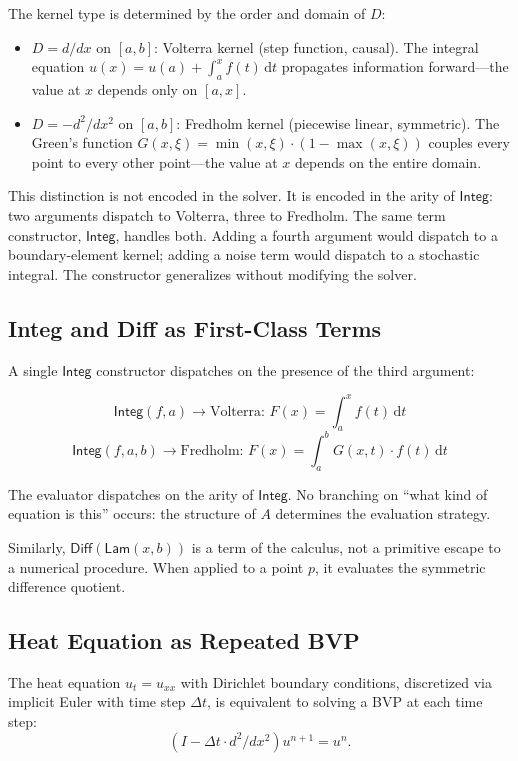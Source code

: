 \documentclass{lmcs}
\theoremstyle{plain}
\theoremstyle{definition}
\begin{document}
The kernel type is determined by the order and domain of $D$:
\begin{itemize}
\item $D = d/dx$ on $[a, b]$: Volterra kernel (step function, causal). The
  integral equation $u(x) = u(a) + \int_a^x f(t)\,\mathrm{d}t$ propagates
  information forward---the value at $x$ depends only on $[a, x]$.
\item $D = -d^2/dx^2$ on $[a, b]$: Fredholm kernel (piecewise linear,
  symmetric). The Green's function $G(x, \xi) = \min(x, \xi) \cdot (1 -
  \max(x, \xi))$ couples every point to every other point---the value at $x$
  depends on the entire domain.
\end{itemize}
This distinction is not encoded in the solver. It is encoded in the arity of
$\mathsf{Integ}$: two arguments dispatch to Volterra, three to Fredholm. The
same term constructor, $\mathsf{Integ}$, handles both. Adding a fourth
argument would dispatch to a boundary-element kernel; adding a noise term
would dispatch to a stochastic integral. The constructor generalizes without
modifying the solver.

\subsection{Integ and Diff as First-Class Terms}

A single $\mathsf{Integ}$ constructor dispatches on the presence of the
third argument:

\begin{defi}
\[
\mathsf{Integ}(f, a) \to \text{Volterra: } F(x) = \int_a^x f(t)\,\mathrm{d}t
\]
\[
\mathsf{Integ}(f, a, b) \to \text{Fredholm: }
F(x) = \int_a^b G(x, t) \cdot f(t)\,\mathrm{d}t
\]
\end{defi}

The evaluator dispatches on the arity of $\mathsf{Integ}$. No branching on
``what kind of equation is this'' occurs: the structure of $A$ determines the
evaluation strategy.

Similarly, $\mathsf{Diff}(\mathsf{Lam}(x, b))$ is a term of the calculus,
not a primitive escape to a numerical procedure. When applied to a point
$p$, it evaluates the symmetric difference quotient.

\subsection{Heat Equation as Repeated BVP}

\begin{thm}\label{thm:heat-bvp}
The heat equation $u_t = u_{xx}$ with Dirichlet boundary conditions,
discretized via implicit Euler with time step $\Delta t$, is equivalent to
solving a BVP at each time step:
\[
(I - \Delta t \cdot d^2/dx^2) u^{n+1} = u^n.
\]
\end{thm}
\end{document}
